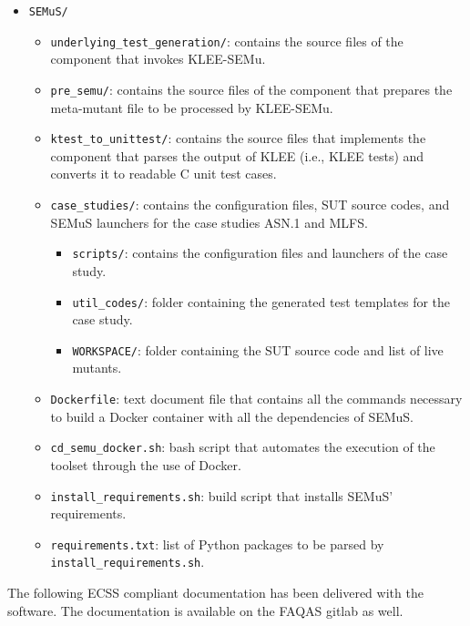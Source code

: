 \begin{itemize}
  \item \texttt{SEMuS/}
  \begin{itemize}
    \item \texttt{underlying\_test\_generation/}: contains the source files of the component that invokes KLEE-SEMu.
    \item \texttt{pre\_semu/}: contains the source files of the component that prepares the meta-mutant file to be processed by KLEE-SEMu.
    \item \texttt{ktest\_to\_unittest/}: contains the source files that implements the component that parses the output of KLEE (i.e., KLEE tests) and converts it to readable C unit test cases.
    \item \texttt{case\_studies/}: contains the configuration files, SUT source codes, and SEMuS launchers for the case studies ASN.1 and MLFS.
    \begin{itemize}
      \item \texttt{scripts/}: contains the configuration files and launchers of the case study.
      \item \texttt{util\_codes/}: folder containing the generated test templates for the case study.
      \item \texttt{WORKSPACE/}: folder containing the SUT source code and list of live mutants.
    \end{itemize}
    \item \texttt{Dockerfile}: text document file that contains all the commands necessary to build a Docker container with all the dependencies of SEMuS.
    \item \texttt{cd\_semu\_docker.sh}: bash script that automates the execution of the toolset through the use of Docker.
    \item \texttt{install\_requirements.sh}: build script that installs SEMuS' requirements.
    \item \texttt{requirements.txt}: list of Python packages to be parsed by \texttt{install\_requirements.sh}.
  \end{itemize}
\end{itemize}

The following ECSS compliant documentation has been delivered with the software. The documentation is available on the FAQAS gitlab as well.

